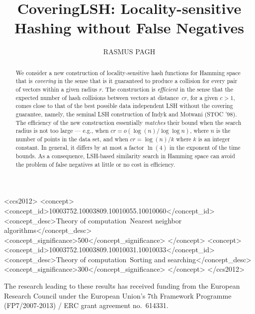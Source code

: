 \documentclass[prodmode,acmtalg]{acmsmall}
\begin{document}

\title{CoveringLSH: Locality-sensitive Hashing without False Negatives}
\author{RASMUS PAGH
}

\begin{abstract}
We consider a new construction of locality-sensitive hash functions for Hamming space that is \emph{covering} in the sense that is it guaranteed to produce a collision for every pair of vectors within a given radius $r$. 
The construction is \emph{efficient} in the sense that the expected number of hash collisions between vectors at distance~$cr$, for a given $c>1$, comes close to that of the best possible data independent LSH without the covering guarantee, namely, the seminal LSH construction of Indyk and Motwani (STOC '98).
The efficiency of the new construction essentially \emph{matches} their bound when the search radius is not too large --- e.g., when $cr = o(\log(n)/\log\log n)$, where $n$ is the number of points in the data set, and when $cr = \log(n)/k$ where $k$ is an integer constant.
In general, it differs by at most a factor $\ln(4)$ in the exponent of the time bounds. 
As a consequence, LSH-based similarity search in Hamming space can avoid the problem of false negatives at little or no cost in efficiency.
\end{abstract}

\begin{CCSXML}
<ccs2012>
<concept>
<concept_id>10003752.10003809.10010055.10010060</concept_id>
<concept_desc>Theory of computation~Nearest neighbor algorithms</concept_desc>
<concept_significance>500</concept_significance>
</concept>
<concept>
<concept_id>10003752.10003809.10010031.10010033</concept_id>
<concept_desc>Theory of computation~Sorting and searching</concept_desc>
<concept_significance>300</concept_significance>
</concept>
</ccs2012>
\end{CCSXML}







\begin{bottomstuff}
The research leading to these results has received funding from the European Research Council under the European Union’s 7th Framework Programme (FP7/2007-2013) / ERC grant agreement no.~614331.
\end{bottomstuff}
\end{document}
